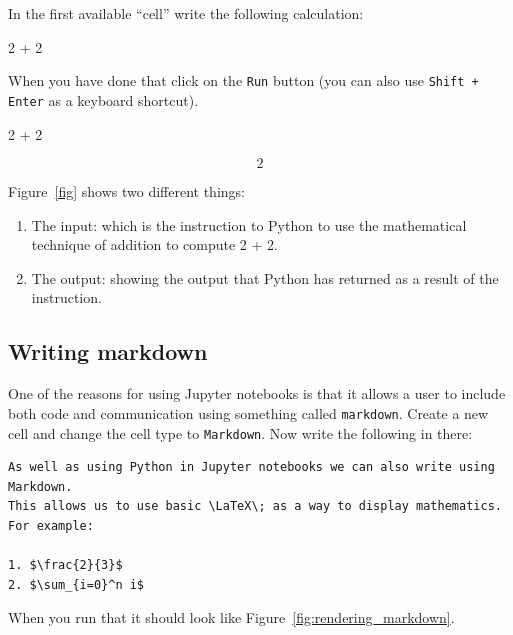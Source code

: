In the first available “cell” write the following calculation:

\begin{pyin}
    2 + 2
\end{pyin}


When you have done that click on the \texttt{Run} button (you can also use
\texttt{Shift + Enter} as a keyboard shortcut).

\begin{pyin}
    2 + 2
\end{pyin}

\[2\]

Figure~\ref{fig} shows two different things:

\begin{enumerate}
\item 

The input: which is the instruction to Python to use the
mathematical technique of addition to compute 2 + 2.

\item 

The output: showing the output that Python has returned as a result
of the instruction.

\end{enumerate}


\subsection{Writing markdown}

One of the reasons for using Jupyter notebooks is that it allows a user to include
both code and communication using something called \texttt{markdown}.
Create a new cell and change the cell type to \texttt{Markdown}. Now write the
following in there:

\begin{verbatim}
As well as using Python in Jupyter notebooks we can also write using Markdown.
This allows us to use basic \LaTeX\; as a way to display mathematics.
For example:

1. $\frac{2}{3}$
2. $\sum_{i=0}^n i$
\end{verbatim}


When you run that it should look like Figure~\ref{fig:rendering_markdown}.

